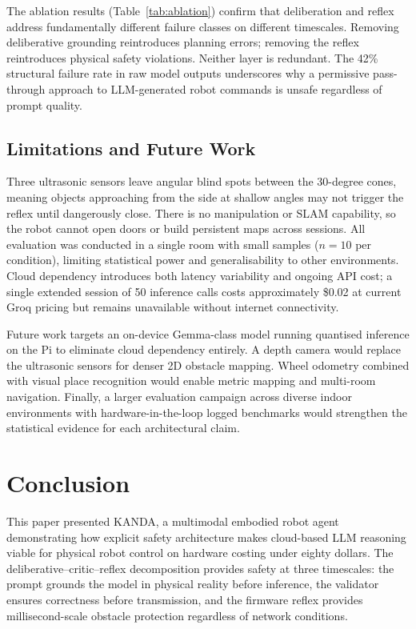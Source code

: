 \documentclass[conference]{IEEEtran}
\begin{document}
The ablation results (Table~\ref{tab:ablation}) confirm that deliberation and reflex address fundamentally different failure classes on different timescales. Removing deliberative grounding reintroduces planning errors; removing the reflex reintroduces physical safety violations. Neither layer is redundant. The 42\% structural failure rate in raw model outputs underscores why a permissive pass-through approach to LLM-generated robot commands is unsafe regardless of prompt quality.

\subsection{Limitations and Future Work}

Three ultrasonic sensors leave angular blind spots between the 30-degree cones, meaning objects approaching from the side at shallow angles may not trigger the reflex until dangerously close. There is no manipulation or SLAM capability, so the robot cannot open doors or build persistent maps across sessions. All evaluation was conducted in a single room with small samples ($n{=}10$ per condition), limiting statistical power and generalisability to other environments. Cloud dependency introduces both latency variability and ongoing API cost; a single extended session of 50 inference calls costs approximately \$0.02 at current Groq pricing but remains unavailable without internet connectivity.

Future work targets an on-device Gemma-class model running quantised inference on the Pi to eliminate cloud dependency entirely. A depth camera would replace the ultrasonic sensors for denser 2D obstacle mapping. Wheel odometry combined with visual place recognition would enable metric mapping and multi-room navigation. Finally, a larger evaluation campaign across diverse indoor environments with hardware-in-the-loop logged benchmarks would strengthen the statistical evidence for each architectural claim.

\section{Conclusion}
\label{sec:conclusion}

This paper presented KANDA, a multimodal embodied robot agent demonstrating how explicit safety architecture makes cloud-based LLM reasoning viable for physical robot control on hardware costing under eighty dollars. The deliberative--critic--reflex decomposition provides safety at three timescales: the prompt grounds the model in physical reality before inference, the validator ensures correctness before transmission, and the firmware reflex provides millisecond-scale obstacle protection regardless of network conditions.
\end{document}
